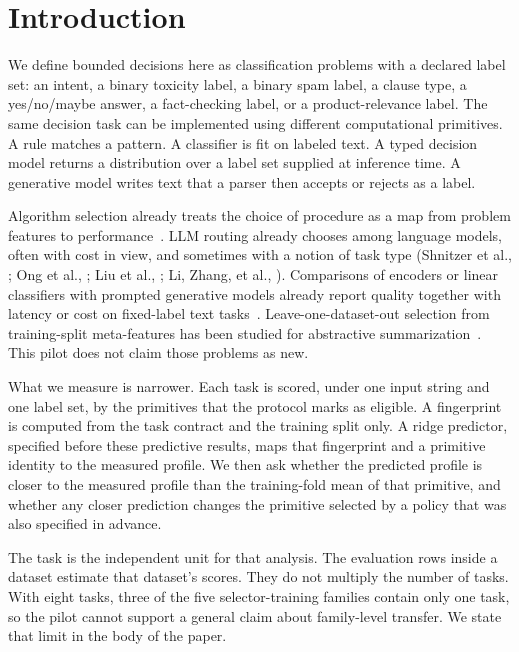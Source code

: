 \section{Introduction}
\label{sec:introduction}

We define bounded decisions here as classification problems with a declared label set: an intent, a binary toxicity label, a binary spam label, a clause type, a yes/no/maybe answer, a fact-checking label, or a product-relevance label. The same decision task can be implemented using different computational primitives. A rule matches a pattern. A classifier is fit on labeled text. A typed decision model returns a distribution over a label set supplied at inference time. A generative model writes text that a parser then accepts or rejects as a label.

Algorithm selection already treats the choice of procedure as a map from problem features to performance~\citep{rice1976,smithmiles2009}. LLM routing already chooses among language models, often with cost in view, and sometimes with a notion of task type (Shnitzer et al., \citeyear{shnitzer2023}; Ong et al., \citeyear{ong2024}; Liu et al., \citeyear{liu2026trouter}; Li, Zhang, et al., \citeyear{li2026llmrouterbench}). Comparisons of encoders or linear classifiers with prompted generative models already report quality together with latency or cost on fixed-label text tasks~\citep{zhang2025tamas,gonzalez2026,bucher2024,vajjala2025}. Leave-one-dataset-out selection from training-split meta-features has been studied for abstractive summarization~\citep{bino2026}. This pilot does not claim those problems as new.

What we measure is narrower. Each task is scored, under one input string and one label set, by the primitives that the protocol marks as eligible. A fingerprint is computed from the task contract and the training split only. A ridge predictor, specified before these predictive results, maps that fingerprint and a primitive identity to the measured profile. We then ask whether the predicted profile is closer to the measured profile than the training-fold mean of that primitive, and whether any closer prediction changes the primitive selected by a policy that was also specified in advance.

The task is the independent unit for that analysis. The evaluation rows inside a dataset estimate that dataset's scores. They do not multiply the number of tasks. With eight tasks, three of the five selector-training families contain only one task, so the pilot cannot support a general claim about family-level transfer. We state that limit in the body of the paper.

